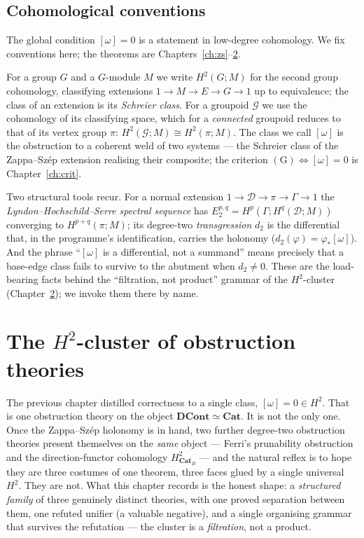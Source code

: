 \documentclass[11pt]{report}
\theoremstyle{plain}
\theoremstyle{definition}
\theoremstyle{remark}
\newcommand{\DCont}{\mathbf{DCont}}
\newcommand{\Cat}{\mathbf{Cat}}
\newcommand{\Hcoh}{H^2}
\newcommand{\iso}{\cong}
\begin{document}
\section{Cohomological conventions}
\label{sec:prelim-coh}

The global condition $[\omega]=0$ is a statement in low-degree cohomology. We fix
conventions here; the theorems are Chapters~\ref{ch:zs}--\ref{ch:cluster}.

For a group $G$ and a $G$-module $M$ we write $\Hcoh(G;M)$ for the second group
cohomology, classifying extensions $1\to M\to E\to G\to1$ up to equivalence; the
class of an extension is its \emph{Schreier class}. For a groupoid $\mathcal G$ we
use the cohomology of its classifying space, which for a \emph{connected}
groupoid reduces to that of its vertex group $\pi$: $\Hcoh(\mathcal G;M)\iso
\Hcoh(\pi;M)$. The class we call $[\omega]$ is the obstruction to a coherent weld
of two systems --- the Schreier class of the Zappa--Sz\'ep extension realising
their composite; the criterion $(\mathrm{G})\iff[\omega]=0$ is
Chapter~\ref{ch:crit}.

Two structural tools recur. For a normal extension
$1\to\mathcal D\to\pi\to\Gamma\to1$ the \emph{Lyndon--Hochschild--Serre spectral
sequence} has $E_2^{p,q}=H^{p}(\Gamma;H^{q}(\mathcal D;M))$ converging to
$H^{p+q}(\pi;M)$; its degree-two \emph{transgression} $d_2$ is the differential
that, in the programme's identification, carries the holonomy
($d_2(\varphi)=\varphi_*[\omega]$). And the phrase ``$[\omega]$ is a differential,
not a summand'' means precisely that a base-edge class fails to survive to the
abutment when $d_2\neq0$. These are the load-bearing facts behind the
``filtration, not product'' grammar of the $\Hcoh$-cluster
(Chapter~\ref{ch:cluster}); we invoke them there by name.







\chapter{The $\Hcoh$-cluster of obstruction theories}
\label{ch:cluster}

The previous chapter distilled correctness to a single class,
$[\omega]=0\in\Hcoh$. That is one obstruction theory on the object
$\DCont\simeq\Cat$. It is not the only one. Once the Zappa--Sz\'ep holonomy is in
hand, two further degree-two obstruction theories present themselves on the
\emph{same} object --- Ferri's prunability obstruction and the direction-functor
cohomology $\Hcoh_{\Cat_B}$ --- and the natural reflex is to hope they are three
costumes of one theorem, three faces glued by a single universal $\Hcoh$. They
are not. What this chapter records is the honest shape: a \emph{structured
family} of three genuinely distinct theories, with one proved separation between
them, one refuted unifier (a valuable negative), and a single organising grammar
that survives the refutation --- the cluster is a \emph{filtration}, not a
product.
\end{document}
